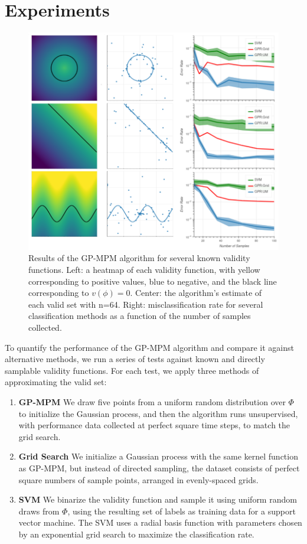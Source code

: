 \documentclass[letterpaper, 10 pt, conference]{ieeeconf}
\begin{document}
\section{Experiments}

\begin{figure}[htbp]
    \centerline{\includegraphics[width=\textwidth]{img/multi_comp.png}}
    \caption{Results of the GP-MPM algorithm for several known validity functions. Left: a heatmap of each validity function, with yellow corresponding to positive values, blue to negative, and the black line corresponding to $v(\phi)=0$. Center: the algorithm's estimate of each valid set with n=64. Right: misclassification rate for several classification methods as a function of the number of samples collected.}
    \label{fig:multicomp}
\end{figure}

To quantify the performance of the GP-MPM algorithm and compare it against alternative methods, we run a series of tests against known and directly samplable validity functions. For each test, we apply three methods of approximating the valid set:

\begin{enumerate}
    \item \textbf{GP-MPM} We draw five points from a uniform random distribution over $\Phi$ to initialize the Gaussian process, and then the algorithm runs unsupervised, with performance data collected at perfect square time steps, to match the grid search.
    \item \textbf{Grid Search} We initialize a Gaussian process with the same kernel function as GP-MPM, but instead of directed sampling, the dataset consists of perfect square numbers of sample points, arranged in evenly-spaced grids.
    \item \textbf{SVM} We binarize the validity function and sample it using uniform random draws from $\Phi$, using the resulting set of labels as training data for a support vector machine. The SVM uses a radial basis function with parameters chosen by an exponential grid search to maximize the classification rate.
\end{enumerate}
\end{document}
